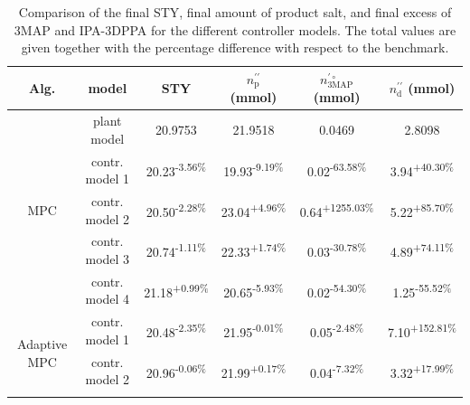 \begin{table}[h]
    \centering
    \small
    \setlength{\tabcolsep}{4pt}
      \caption{Comparison of the final \ac{STY}, final amount of product salt, and final excess of \ac{3MAP} and \ac{IPA-3DPPA} for the different controller models. The total values are given together with the percentage difference with respect to the benchmark.}
  \label{Tab:result percentage}
 \begin{tabular}{c|c|c|c|c|c} 
  Alg. & model & \ac{STY} & $n_{\text{p}}^{\prime\prime}$ (mmol) & $n_{\text{3MAP}}^{\prime\circ}$ (mmol) & $n_{\text{d}}^{\prime\prime}$ (mmol) \\ \hline \hline
  \multirow{5}{*}{\ac{MPC}} & plant model & 20.9753 & 21.9518 & 0.0469 & 2.8098 \\ \cline{2-6}
    & contr. model 1 & \cellcolor{red!8} 20.23\textsuperscript{\scriptsize -3.56\%} & \cellcolor{red!14} 19.93\textsuperscript{\scriptsize -9.19\%} & \cellcolor{green!36} 0.02\textsuperscript{\scriptsize -63.58\%} & \cellcolor{red!29} 3.94\textsuperscript{\scriptsize +40.30\%} \\ \cline{2-6}
    & contr. model 2 & \cellcolor{red!7} 20.50\textsuperscript{\scriptsize -2.28\%} & \cellcolor{green!10} 23.04\textsuperscript{\scriptsize +4.96\%} & \cellcolor{red!40} 0.64\textsuperscript{\scriptsize +1255.03\%} & \cellcolor{red!40} 5.22\textsuperscript{\scriptsize +85.70\%} \\ \cline{2-6}
    & contr. model 3 & \cellcolor{red!5} 20.74\textsuperscript{\scriptsize -1.11\%} & \cellcolor{green!6} 22.33\textsuperscript{\scriptsize +1.74\%} & \cellcolor{green!25} 0.03\textsuperscript{\scriptsize -30.78\%} & \cellcolor{red!39} 4.89\textsuperscript{\scriptsize +74.11\%} \\ \cline{2-6}
    & contr. model 4 & \cellcolor{green!4} 21.18\textsuperscript{\scriptsize +0.99\%} & \cellcolor{red!11} 20.65\textsuperscript{\scriptsize -5.93\%} & \cellcolor{green!33} 0.02\textsuperscript{\scriptsize -54.30\%} & \cellcolor{green!34} 1.25\textsuperscript{\scriptsize -55.52\%} \\ \hline
  \multirow{4}{*}{Adaptive \ac{MPC}}  & contr. model 1 & \cellcolor{red!7} 20.48\textsuperscript{\scriptsize -2.35\%} & \cellcolor{red!3} 21.95\textsuperscript{\scriptsize -0.01\%} & \cellcolor{green!7} 0.05\textsuperscript{\scriptsize -2.48\%} & \cellcolor{red!40} 7.10\textsuperscript{\scriptsize +152.81\%} \\ \cline{2-6}
    & contr. model 2 & \cellcolor{red!3} 20.96\textsuperscript{\scriptsize -0.06\%} & \cellcolor{green!3} 21.99\textsuperscript{\scriptsize +0.17\%} & \cellcolor{green!12} 0.04\textsuperscript{\scriptsize -7.32\%} & \cellcolor{red!19} 3.32\textsuperscript{\scriptsize +17.99\%} \\ \cline{2-6}

\end{tabular}
\end{table}
